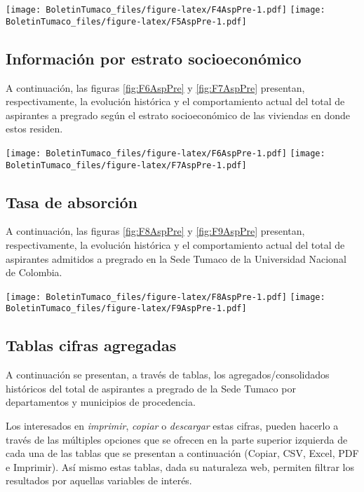 \documentclass[
]{book}
\begin{document}
\texttt{[image: BoletinTumaco\_files/figure-latex/F4AspPre-1.pdf]}
\texttt{[image: BoletinTumaco\_files/figure-latex/F5AspPre-1.pdf]}

\hypertarget{informaciuxf3n-por-estrato-socioeconuxf3mico}{%
\subsection{Información por estrato socioeconómico}\label{informaciuxf3n-por-estrato-socioeconuxf3mico}}

A continuación, las figuras \ref{fig:F6AspPre} y \ref{fig:F7AspPre} presentan, respectivamente, la evolución histórica y el comportamiento actual del total de aspirantes a pregrado según el estrato socioeconómico de las viviendas en donde estos residen.

\texttt{[image: BoletinTumaco\_files/figure-latex/F6AspPre-1.pdf]}
\texttt{[image: BoletinTumaco\_files/figure-latex/F7AspPre-1.pdf]}

\hypertarget{tasa-de-absorciuxf3n}{%
\subsection{Tasa de absorción}\label{tasa-de-absorciuxf3n}}

A continuación, las figuras \ref{fig:F8AspPre} y \ref{fig:F9AspPre} presentan, respectivamente, la evolución histórica y el comportamiento actual del total de aspirantes admitidos a pregrado en la Sede Tumaco de la Universidad Nacional de Colombia.

\texttt{[image: BoletinTumaco\_files/figure-latex/F8AspPre-1.pdf]}
\texttt{[image: BoletinTumaco\_files/figure-latex/F9AspPre-1.pdf]}

\hypertarget{tablas-cifras-agregadas}{%
\subsection{Tablas cifras agregadas}\label{tablas-cifras-agregadas}}

A continuación se presentan, a través de tablas, los agregados/consolidados históricos del total de aspirantes a pregrado de la Sede Tumaco por departamentos y municipios de procedencia.

Los interesados en \emph{imprimir}, \emph{copiar} o \emph{descargar} estas cifras, pueden hacerlo a través de las múltiples opciones que se ofrecen en la parte superior izquierda de cada una de las tablas que se presentan a continuación (Copiar, CSV, Excel, PDF e Imprimir). Así mismo estas tablas, dada su naturaleza web, permiten filtrar los resultados por aquellas variables de interés.
\end{document}
